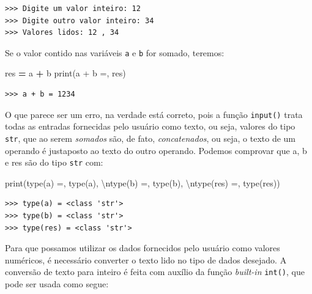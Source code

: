 \documentclass[
]{book}
\newenvironment{Shaded}{\begin{snugshade}}{\end{snugshade}}
\newcommand{\BuiltInTok}[1]{#1}
\newcommand{\CharTok}[1]{\textcolor[rgb]{0.31,0.60,0.02}{#1}}
\newcommand{\NormalTok}[1]{#1}
\newcommand{\OperatorTok}[1]{\textcolor[rgb]{0.81,0.36,0.00}{\textbf{#1}}}
\newcommand{\StringTok}[1]{\textcolor[rgb]{0.31,0.60,0.02}{#1}}
\begin{document}
\begin{verbatim}
>>> Digite um valor inteiro: 12
>>> Digite outro valor inteiro: 34
>>> Valores lidos: 12 , 34
\end{verbatim}

Se o valor contido nas variáveis \texttt{a} e \texttt{b} for somado, teremos:

\begin{Shaded}
\begin{Highlighting}[]
\NormalTok{res }\OperatorTok{=}\NormalTok{ a }\OperatorTok{+}\NormalTok{ b}
\BuiltInTok{print}\NormalTok{(}\StringTok{\textquotesingle{}a + b =\textquotesingle{}}\NormalTok{, res)}
\end{Highlighting}
\end{Shaded}

\begin{verbatim}
>>> a + b = 1234
\end{verbatim}

O que parece ser um erro, na verdade está correto, pois a função \texttt{input()} trata todas as entradas fornecidas pelo usuário como texto, ou seja, valores do tipo \texttt{str}, que ao serem \emph{somados} são, de fato, \emph{concatenados}, ou seja, o texto de um operando é justaposto ao texto do outro operando. Podemos comprovar que a, b e res são do tipo \texttt{str} com:

\begin{Shaded}
\begin{Highlighting}[]
\BuiltInTok{print}\NormalTok{(}\StringTok{\textquotesingle{}type(a) =\textquotesingle{}}\NormalTok{, }\BuiltInTok{type}\NormalTok{(a), }\StringTok{\textquotesingle{}}\CharTok{\textbackslash{}n}\StringTok{type(b) =\textquotesingle{}}\NormalTok{, }\BuiltInTok{type}\NormalTok{(b), }\StringTok{\textquotesingle{}}\CharTok{\textbackslash{}n}\StringTok{type(res) =\textquotesingle{}}\NormalTok{, }\BuiltInTok{type}\NormalTok{(res))}
\end{Highlighting}
\end{Shaded}

\begin{verbatim}
>>> type(a) = <class 'str'> 
>>> type(b) = <class 'str'> 
>>> type(res) = <class 'str'>
\end{verbatim}

Para que possamos utilizar os dados fornecidos pelo usuário como valores numéricos, é necessário converter o texto lido no tipo de dados desejado. A conversão de texto para inteiro é feita com auxílio da função \emph{built-in} \texttt{int()}, que pode ser usada como segue:
\end{document}
